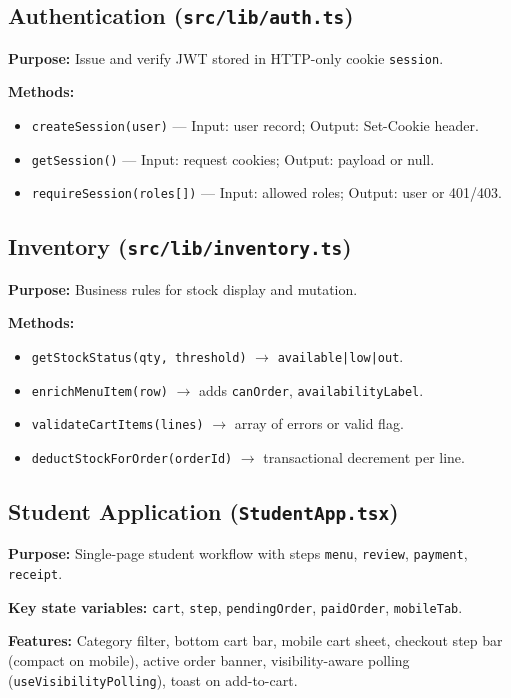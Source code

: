 \subsection{Authentication (\texttt{src/lib/auth.ts})}
\textbf{Purpose:} Issue and verify JWT stored in HTTP-only cookie \texttt{session}.

\textbf{Methods:}
\begin{itemize}
  \item \texttt{createSession(user)} --- Input: user record; Output: Set-Cookie header.
  \item \texttt{getSession()} --- Input: request cookies; Output: payload or null.
  \item \texttt{requireSession(roles[])} --- Input: allowed roles; Output: user or 401/403.
\end{itemize}

\subsection{Inventory (\texttt{src/lib/inventory.ts})}
\textbf{Purpose:} Business rules for stock display and mutation.

\textbf{Methods:}
\begin{itemize}
  \item \texttt{getStockStatus(qty, threshold)} $\rightarrow$ \texttt{available|low|out}.
  \item \texttt{enrichMenuItem(row)} $\rightarrow$ adds \texttt{canOrder}, \texttt{availabilityLabel}.
  \item \texttt{validateCartItems(lines)} $\rightarrow$ array of errors or valid flag.
  \item \texttt{deductStockForOrder(orderId)} $\rightarrow$ transactional decrement per line.
\end{itemize}

\subsection{Student Application (\texttt{StudentApp.tsx})}
\textbf{Purpose:} Single-page student workflow with steps \texttt{menu}, \texttt{review}, \texttt{payment}, \texttt{receipt}.

\textbf{Key state variables:} \texttt{cart}, \texttt{step}, \texttt{pendingOrder}, \texttt{paidOrder}, \texttt{mobileTab}.

\textbf{Features:} Category filter, bottom cart bar, mobile cart sheet, checkout step bar (compact on mobile), active order banner, visibility-aware polling (\texttt{useVisibilityPolling}), toast on add-to-cart.

